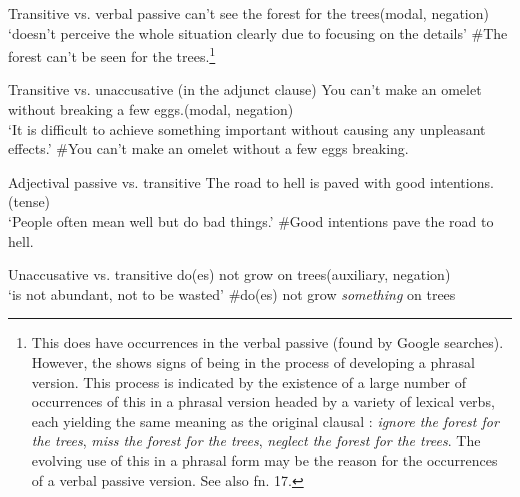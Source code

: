 \documentclass[output=paper,
modfonts
]{LSP/langsci}
\begin{document}
\noindent Transitive vs. verbal passive
\ea \label{ex:horvath:26}
	\ea \label{ex:horvath:26a} can't see the forest for the trees\hfill (modal, negation)\\
	`doesn't perceive the whole situation clearly due to focusing on the
	details'
	\ex \label{ex:horvath:26b} \#The forest can't be seen for the trees.\footnote{This  does
  	have occurrences in the verbal passive (found by Google searches).
  	However, the  shows signs of being in the process of developing a
  	phrasal version. This process is indicated by the existence of a large
  	number of occurrences of this  in a phrasal version headed by a
  	variety of lexical verbs, each yielding the same meaning as the
  	original clausal : \emph{ignore the forest for the trees},
  	\emph{miss the forest for the trees}, \emph{neglect the forest for the
  	trees}. The evolving use of this  in a phrasal form may be the
  	reason for the occurrences of a verbal passive version. See also fn.
  	17.}
	\z
\z

\newpage 
\noindent Transitive vs. unaccusative (in the adjunct clause)
\ea \label{ex:horvath:27}
	\ea \label{ex:horvath:27a} You can't make an omelet without breaking a few eggs.\hfill(modal, negation)\\
	`It is difficult to achieve something important without causing any unpleasant effects.'
	\ex \label{ex:horvath:27b} \#You can't make an omelet without a few eggs breaking.
	\z
\z

\noindent Adjectival passive vs. transitive
\ea \label{ex:horvath:28}
	\ea \label{ex:horvath:28a} The road to hell is paved with good intentions.\hfill  (tense)\\
	`People often mean well but do bad things.'
	\ex \label{ex:horvath:28b} \#Good intentions pave the road to hell.
	\z
\z

\noindent Unaccusative vs. transitive
\ea \label{ex:horvath:29}
	\ea \label{ex:horvath:29a} do(es) not grow on trees\hfill (auxiliary, negation)\\
	`is not abundant, not to be wasted'
	\ex \label{ex:horvath:29b} \#do(es) not grow \emph{something} on trees
	\z
\z
\end{document}
